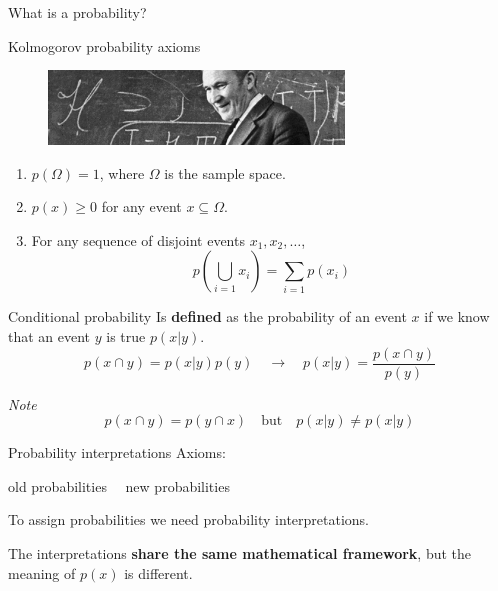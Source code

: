 \documentclass[
aspectratio=169,
14pt,
professionalfonts
]{beamer}
\newcommand{\arrow}{~\ding{220}~}
\begin{document}
\begin{frame}
\centering
\Large
What is a probability?
\end{frame}

\begin{frame}{Kolmogorov probability axioms}
\begin{figure}
    \centering
    \includegraphics[width=0.7\textwidth]{../plots/kolmogorov.jpg}
\end{figure}
\begin{enumerate}
  \item $ p(\Omega) = 1 $, where \( \Omega \) is the sample space.
  \item $ p(x) \geq 0 $ for any event \( x \subseteq \Omega \).
  \item For any sequence of disjoint events \( x_1, x_2, \dots \),
        $$
        p\left( \bigcup_{i=1} x_i \right) = \sum_{i=1} p(x_i)
        $$
\end{enumerate}
\end{frame}


\begin{frame}{Conditional probability}
Is \textbf{defined} as the probability of an event $x$ if we know that an event $y$ is true $p(x|y)$.
$$p(x \cap y) = p(x|y)p(y) \quad \to \quad p(x|y) = \frac{p(x \cap y)}{p(y)}$$

\textit{Note} 
$$p(x \cap y) = p(y \cap x) \quad  \text{but} \quad p(x|y) \neq p(x|y)$$ 
\end{frame}

\begin{frame}{Probability interpretations}
    Axioms:
    \begin{center}
        old probabilities \arrow new probabilities
    \end{center}
    
    \vspace{0.5cm}
    To assign probabilities we need probability interpretations.

    \vspace{0.5cm}
    The interpretations \textbf{share the same mathematical framework}, but the meaning of $p(x)$ is different.
\end{frame}
\end{document}
